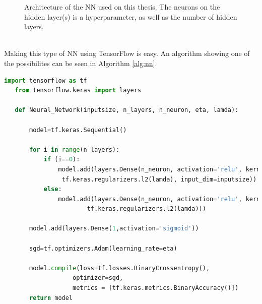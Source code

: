 \documentclass[14pt, a4paper]{book}
\begin{document}
\begin{figure}[!ht]
   \caption[Neural Network Architecture]{Architecture of the NN used on this thesis. 
   The neurons on the hidden layer(s) is a hyperparameter, as well as the number of hidden layers. }\label{fig:NNArch}
\end{figure}
\\Making this type of NN using TensorFlow is easy. An algorithm showing one of the possibilites can be seen in Algorithm \ref{alg:nn}.
\begin{lstlisting}[language=Python, caption={Neural network definition using TensorFlow}, label=alg:nn, captionpos=t]
   import tensorflow as tf
   from tensorflow.keras import layers
   
   def Neural_Network(inputsize, n_layers, n_neuron, eta, lamda):
       
       model=tf.keras.Sequential()      
       
       for i in range(n_layers):       
           if (i==0):                  
               model.add(layers.Dense(n_neuron, activation='relu', kernel_regularizer=
                tf.keras.regularizers.l2(lamda), input_dim=inputsize))
           else:                       
               model.add(layers.Dense(n_neuron, activation='relu', kernel_regularizer=
                       tf.keras.regularizers.l2(lamda)))
                       
       model.add(layers.Dense(1,activation='sigmoid')) 
       
       sgd=tf.optimizers.Adam(learning_rate=eta)
       
       model.compile(loss=tf.losses.BinaryCrossentropy(),
                   optimizer=sgd,
                   metrics = [tf.keras.metrics.BinaryAccuracy()])
       return model
   \end{lstlisting}
\clearpage
\end{document}
